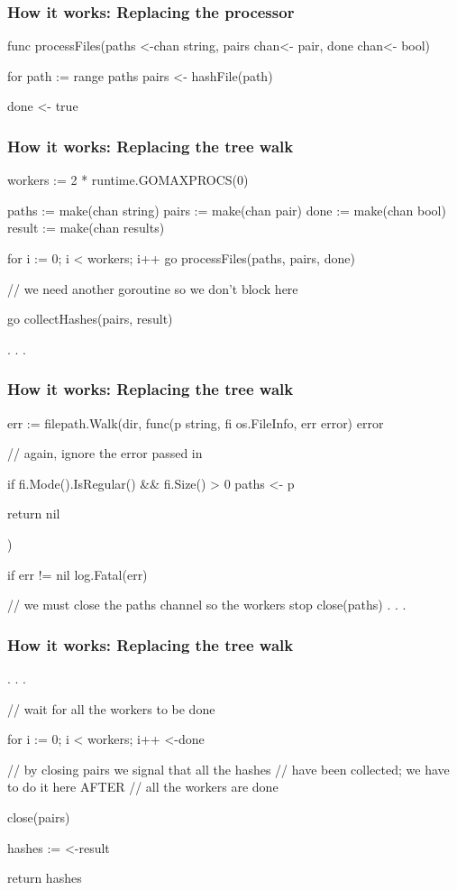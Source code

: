 \documentclass[compress,t,11pt]{beamer}
\begin{document}
\begin{frame}[fragile]
    \frametitle{How it works: Replacing the processor}
\begin{golang}
func processFiles(paths <-chan string, pairs chan<- pair,
                  done chan<- bool) {
	for path := range paths {
		pairs <- hashFile(path)
	}

	done <- true
}
\end{golang}
\end{frame}

\begin{frame}[fragile]
    \frametitle{How it works: Replacing the tree walk}
\begin{golang}
workers := 2 * runtime.GOMAXPROCS(0)

paths := make(chan string)
pairs := make(chan pair)
done := make(chan bool)
result := make(chan results)

for i := 0; i < workers; i++ {
	go processFiles(paths, pairs, done)
}

// we need another goroutine so we don't block here

go collectHashes(pairs, result)

. . .
\end{golang}
\end{frame}

\begin{frame}[fragile]
    \frametitle{How it works: Replacing the tree walk}
\begin{golang}
err := filepath.Walk(dir, func(p string, fi os.FileInfo,
                               err error) error {
	// again, ignore the error passed in

	if fi.Mode().IsRegular() && fi.Size() > 0 {
		paths <- p
	}

	return nil
})

if err != nil {
    log.Fatal(err)
}

// we must close the paths channel so the workers stop
close(paths)
. . .
\end{golang}
\end{frame}

\begin{frame}[fragile]
    \frametitle{How it works: Replacing the tree walk}
\begin{golang}
. . .

// wait for all the workers to be done

for i := 0; i < workers; i++ {
	<-done
}

// by closing pairs we signal that all the hashes
// have been collected; we have to do it here AFTER
// all the workers are done

close(pairs)

hashes := <-result

return hashes
\end{golang}
\end{frame}
\end{document}

